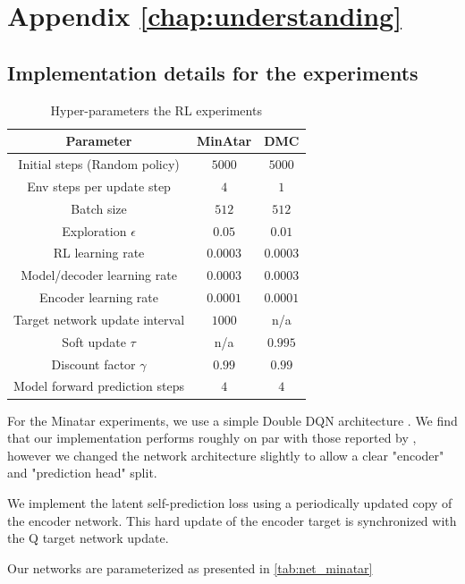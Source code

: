 \chapter{Appendix \autoref{chap:understanding}}


\section{Implementation details for the experiments}
\label{app:empirical}

\begin{table}[]
    \centering
    \begin{tabular}{c|c|c}
        Parameter & MinAtar & DMC \\\hline 
        Initial steps (Random policy) & $5000$ & $5000$  \\
        Env steps per update step & $4$ & $1$\\
        Batch size & $512$ & $512$\\
        Exploration $\epsilon$ & $0.05$ & $0.01$\\
        RL learning rate & $0.0003$ & $0.0003$\\
        Model/decoder learning rate & $0.0003$ & $0.0003$\\
        Encoder learning rate & $0.0001$ & $0.0001$\\
        Target network update interval & $1000$ & n/a\\
        Soft update $\tau$ & n/a & $0.995$ \\
        Discount factor $\gamma$ & $0.99$ & $0.99$\\
        Model forward prediction steps & $4$ & $4$\\
    \end{tabular}
    \caption{Hyper-parameters the RL experiments}
    \label{tab:hyper_minatar}
\end{table}

For the Minatar experiments, we use a simple Double DQN architecture \parencite{van2016deep}.
We find that our implementation performs roughly on par with those reported by \textcite{young19minatar}, however we changed the network architecture slightly to allow a clear "encoder" and "prediction head" split.

We implement the latent self-prediction loss using a periodically updated copy of the encoder network. This hard update of the encoder target is synchronized with the Q target network update.

Our networks are parameterized as presented in \autoref{tab:net_minatar}


